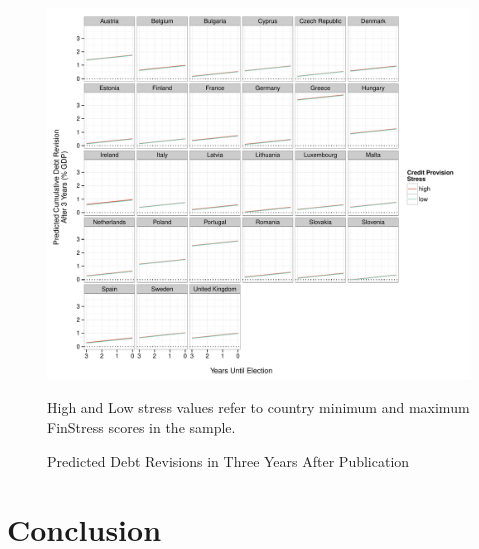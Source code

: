 \documentclass[]{article}
\begin{document}
\begin{figure}
	\caption{Predicted Debt Revisions in Three Years After Publication}
    \label{country_predict_debt}
    \begin{center}
    	\includegraphics[scale=0.65]{figures/country_predict.pdf}
    \end{center}

	{\scriptsize{High and Low stress values refer to country minimum and maximum FinStress scores in the sample.}}

\end{figure}


\section{Conclusion}


\clearpage



\end{document}
